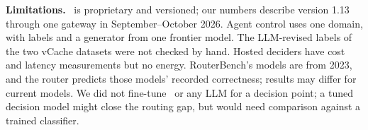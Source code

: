 \textbf{Limitations.}
\jev\ is proprietary and versioned; our numbers describe version 1.13 through one gateway in September--October 2026. Agent control uses one domain, with labels and a generator from one frontier model. The LLM-revised labels of the two vCache datasets were not checked by hand. Hosted deciders have cost and latency measurements but no energy. RouterBench's models are from 2023, and the router predicts those models' recorded correctness; results may differ for current models. We did not fine-tune \kev\ or any LLM for a decision point; a tuned decision model might close the routing gap, but would need comparison against a trained classifier.

